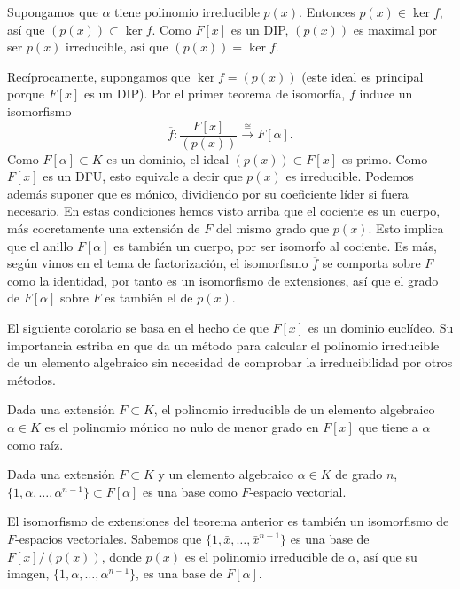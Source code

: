 Supongamos que \(\alpha\) tiene polinomio irreducible \(p(x)\). Entonces
\(p(x)\in\ker f\), así que \((p(x))\subset\ker f\). Como \(F[x]\) es un
DIP, \((p(x))\) es maximal por ser \(p(x)\) irreducible, así que
\((p(x))=\ker f\).

Recíprocamente, supongamos que \(\ker f=(p(x))\) (este ideal es
principal porque \(F[x]\) es un DIP). Por el primer teorema de
isomorfía, \(f\) induce un isomorfismo
\[\overline{f}\colon\frac{F[x]}{(p(x))}\stackrel{\cong}\longrightarrow F[\alpha].\]
Como \(F[\alpha]\subset K\) es un dominio, el ideal
\((p(x))\subset F[x]\) es primo. Como \(F[x]\) es un DFU, esto equivale
a decir que \(p(x)\) es irreducible. Podemos además suponer que es
mónico, dividiendo por su coeficiente líder si fuera necesario. En estas
condiciones hemos visto arriba que el cociente es un cuerpo, más
cocretamente una extensión de \(F\) del mismo grado que \(p(x)\). Esto
implica que el anillo \(F[\alpha]\) es también un cuerpo, por ser
isomorfo al cociente. Es más, según vimos en el tema de factorización,
el isomorfismo \(\overline{f}\) se comporta sobre \(F\) como la
identidad, por tanto es un isomorfismo de extensiones, así que el grado
de \(F[\alpha]\) sobre \(F\) es también el de \(p(x)\). 

El siguiente corolario se basa en el hecho de que \(F[x]\) es un dominio
euclídeo. Su importancia estriba en que da un método para calcular el
polinomio irreducible de un elemento algebraico sin necesidad de
comprobar la irreducibilidad por otros métodos.


Dada una extensión \(F\subset K\), el polinomio irreducible de un
elemento algebraico \(\alpha\in K\) es el polinomio mónico no nulo de
menor grado en \(F[x]\) que tiene a \(\alpha\) como raíz.


Dada una extensión \(F\subset K\) y un elemento algebraico
\(\alpha\in K\) de grado \(n\),
\(\{1,\alpha,\dots,\alpha^{n-1}\}\subset F[\alpha]\) es una base como
\(F\)-espacio vectorial. 


El isomorfismo de extensiones del teorema anterior es también un
isomorfismo de \(F\)-espacios vectoriales. Sabemos que
\(\{1,\bar{x},\dots,\bar{x}^{n-1}\}\) es una base de \(F[x]/(p(x))\),
donde \(p(x)\) es el polinomio irreducible de \(\alpha\), así que su
imagen, \(\{1,\alpha,\dots,\alpha^{n-1}\}\), es una base de
\(F[\alpha]\). 

